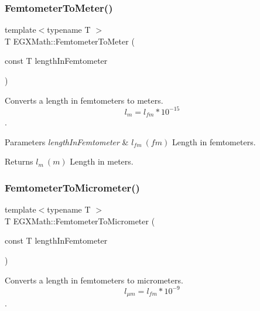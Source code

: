 \subsubsection{\texorpdfstring{Femtometer\+To\+Meter()}{FemtometerToMeter()}}
{\footnotesize\ttfamily template$<$typename T $>$ \\
T E\+G\+X\+Math\+::\+Femtometer\+To\+Meter (\begin{DoxyParamCaption}\item[{const T}]{length\+In\+Femtometer }\end{DoxyParamCaption})}



Converts a length in femtometers to meters. \[ l_{m}=l_{fm} * 10^{-15} \]. 


\begin{DoxyParams}{Parameters}
{\em length\+In\+Femtometer} & $ l_{fm}\ (fm)$ Length in femtometers. \\
\hline
\end{DoxyParams}
\begin{DoxyReturn}{Returns}
$ l_{m}\ (m)$ Length in meters. 
\end{DoxyReturn}
\mbox{\label{group___e_g_x_math-_conversions-_length_conversions-_s_i-_femtometer-_s_i_gac965667884f7a3449072effb83260fe8}} 
\subsubsection{\texorpdfstring{Femtometer\+To\+Micrometer()}{FemtometerToMicrometer()}}
{\footnotesize\ttfamily template$<$typename T $>$ \\
T E\+G\+X\+Math\+::\+Femtometer\+To\+Micrometer (\begin{DoxyParamCaption}\item[{const T}]{length\+In\+Femtometer }\end{DoxyParamCaption})}



Converts a length in femtometers to micrometers. \[ l_{\mu m}=l_{fm} * 10^{-9} \]. 

